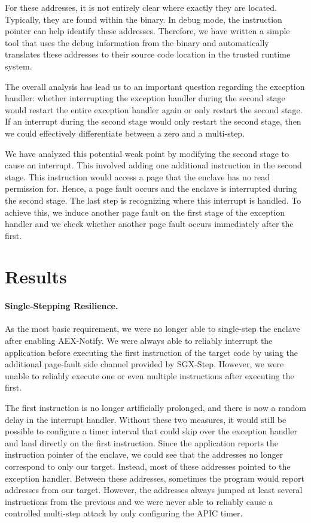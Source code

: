 \documentclass{llncs}
\begin{document}
For these addresses, it is not entirely clear where exactly they are located. Typically, they are found within the binary. In debug mode, the instruction pointer can help identify these addresses.
Therefore, we have written a simple tool that uses the debug information from the binary and
automatically translates these addresses to their source code location in the trusted runtime system.


The overall analysis has lead us to an important question regarding the exception handler:
whether interrupting the exception handler during the second stage would
restart the entire exception handler again or only restart the second stage.
If an interrupt during the second stage would only restart the second stage,
then we could effectively differentiate between a zero and a multi-step.

We have analyzed this potential weak point by modifying the second stage to cause an interrupt.
This involved adding one additional instruction in the second stage.
This instruction would access a page that the enclave has no read permission for.
Hence, a page fault occurs and the enclave is interrupted during the second stage.
The last step is recognizing where this interrupt is handled.
To achieve this, we induce another page fault on the first stage of the exception handler
and we check whether another page fault occurs immediately after the first.

\section{Results}

\paragraph{Single-Stepping Resilience.}
As the most basic requirement,
we were no longer able to single-step the enclave after enabling AEX-Notify.
We were always able to reliably interrupt the application
before executing the first instruction of the target code
by using the additional page-fault side channel provided by SGX-Step.
However, we were unable to reliably execute one or
even multiple instructions after executing the first.

The first instruction is no longer artificially prolonged, and there is now a random delay in the interrupt handler. Without these two measures, it would still be possible to configure a timer interval that could skip over the exception handler and land directly on the first instruction.
Since the application reports the instruction pointer of the enclave,
we could see that the addresses no longer correspond to only our target.
Instead, most of these addresses pointed to the exception handler.
Between these addresses, sometimes the program would report addresses from our target.
However, the addresses always jumped at least several instructions from the previous
and we were never able to reliably cause a controlled multi-step attack
by only configuring the APIC timer.
\end{document}
